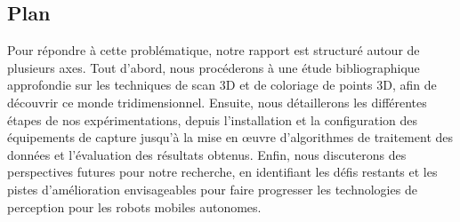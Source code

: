 \subsection{Plan}


\normalsize{
    \setlength{\parindent}{1cm} %
    Pour répondre à cette problématique, notre rapport est structuré autour de plusieurs axes. Tout d'abord, nous procéderons à une étude bibliographique approfondie sur les techniques de scan 3D et de coloriage de points 3D, afin de découvrir ce monde tridimensionnel. Ensuite, nous détaillerons les différentes étapes de nos expérimentations, depuis l'installation et la configuration des équipements de capture jusqu'à la mise en œuvre d'algorithmes de traitement des données et l'évaluation des résultats obtenus. Enfin, nous discuterons des perspectives futures pour notre recherche, en identifiant les défis restants et les pistes d'amélioration envisageables pour faire progresser les technologies de perception pour les robots mobiles autonomes.
}

\clearpage